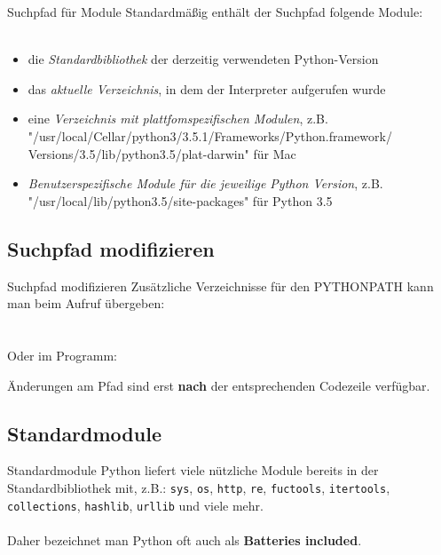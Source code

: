\begin{frame}{Suchpfad f\"ur Module}
	Standardm\"a\ss{}ig enth\"alt der Suchpfad folgende Module: \\ \ \\
	\begin{itemize}
		\item die \textit{Standardbibliothek} der derzeitig verwendeten Python-Version
		\item das \textit{aktuelle Verzeichnis}, in dem der Interpreter aufgerufen wurde
		\item eine \textit{Verzeichnis mit plattfomspezifischen Modulen}, z.B.
			"/usr/local/Cellar/python3/3.5.1/Frameworks/Python.framework/
			Versions/3.5/lib/python3.5/plat-darwin" f\"ur Mac
		\item \textit{Benutzerspezifische Module f\"ur die jeweilige Python Version}, z.B. "/usr/local/lib/python3.5/site-packages" f\"ur Python 3.5
	\end{itemize}
\end{frame}



\subsection{Suchpfad modifizieren}
\begin{frame}{Suchpfad modifizieren}
	Zus\"atzliche Verzeichnisse f\"ur den PYTHONPATH kann man beim Aufruf \"ubergeben:\\
	\hspace*{.5cm}\\ \ \\
	Oder im Programm:
	
	\"Anderungen am Pfad sind erst \textbf{nach} der entsprechenden Codezeile verf\"ugbar.
\end{frame}



\subsection{Standardmodule}
\begin{frame}{Standardmodule}
	Python liefert viele n\"utzliche Module bereits in der Standardbibliothek mit, z.B.:
	\texttt{sys}, \texttt{os}, \texttt{http}, \texttt{re}, \texttt{fuctools}, \texttt{itertools}, \texttt{collections}, \texttt{hashlib}, \texttt{urllib} und viele mehr. \\ \ \\
	Daher bezeichnet man Python oft auch als \textbf{Batteries included}.
\end{frame}

